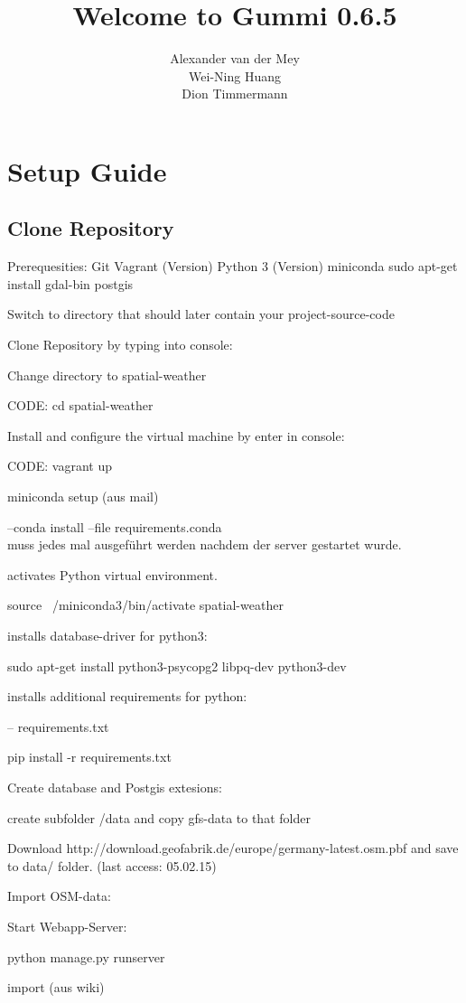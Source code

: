 \documentclass[11pt]{article}
\title{\textbf{Welcome to Gummi 0.6.5}}
\author{Alexander van der Mey\\
		Wei-Ning Huang\\
		Dion Timmermann}
\date{}
\begin{document}
\maketitle

\section{Setup Guide}
\subsection{Clone Repository}

Prerequesities:
Git
Vagrant (Version)
Python 3 (Version)
miniconda
sudo apt-get install gdal-bin postgis

Switch to directory that should later contain your project-source-code

Clone Repository by typing into console:

Change directory to spatial-weather

CODE: cd spatial-weather

Install and configure the virtual machine by enter in console:

CODE: vagrant up

miniconda setup (aus mail)

--conda install --file requirements.conda
\\

muss jedes mal ausgeführt werden nachdem der server gestartet wurde.

activates Python virtual environment.

source ~/miniconda3/bin/activate spatial-weather

installs database-driver for python3:

sudo apt-get install python3-psycopg2 libpq-dev python3-dev

installs additional requirements for python:

-- requirements.txt

pip install -r requirements.txt


Create database and Postgis extesions:


create subfolder /data and copy gfs-data to that folder


Download http://download.geofabrik.de/europe/germany-latest.osm.pbf and save to data/ folder. (last access: 05.02.15)

Import OSM-data:





Start Webapp-Server:

python manage.py runserver

import (aus wiki)
\end{document}
